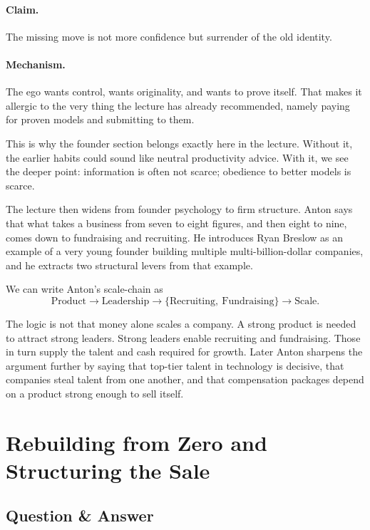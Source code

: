 \paragraph{Claim.}
The missing move is not more confidence but surrender of the old identity.

\paragraph{Mechanism.}
The ego wants control, wants originality, and wants to prove itself. That makes it allergic to the very thing the lecture has already recommended, namely paying for proven models and submitting to them.

This is why the founder section belongs exactly here in the lecture. Without it, the earlier habits could sound like neutral productivity advice. With it, we see the deeper point: information is often not scarce; obedience to better models is scarce.

The lecture then widens from founder psychology to firm structure. Anton says that what takes a business from seven to eight figures, and then eight to nine, comes down to fundraising and recruiting. He introduces Ryan Breslow as an example of a very young founder building multiple multi-billion-dollar companies, and he extracts two structural levers from that example.

We can write Anton's scale-chain as
\begin{equation}
\text{Product} \to \text{Leadership} \to \{\text{Recruiting},\ \text{Fundraising}\} \to \text{Scale}.
\end{equation}

The logic is not that money alone scales a company. A strong product is needed to attract strong leaders. Strong leaders enable recruiting and fundraising. Those in turn supply the talent and cash required for growth. Later Anton sharpens the argument further by saying that top-tier talent in technology is decisive, that companies steal talent from one another, and that compensation packages depend on a product strong enough to sell itself.

\section{Rebuilding from Zero and Structuring the Sale}

\subsection{Question \& Answer}

